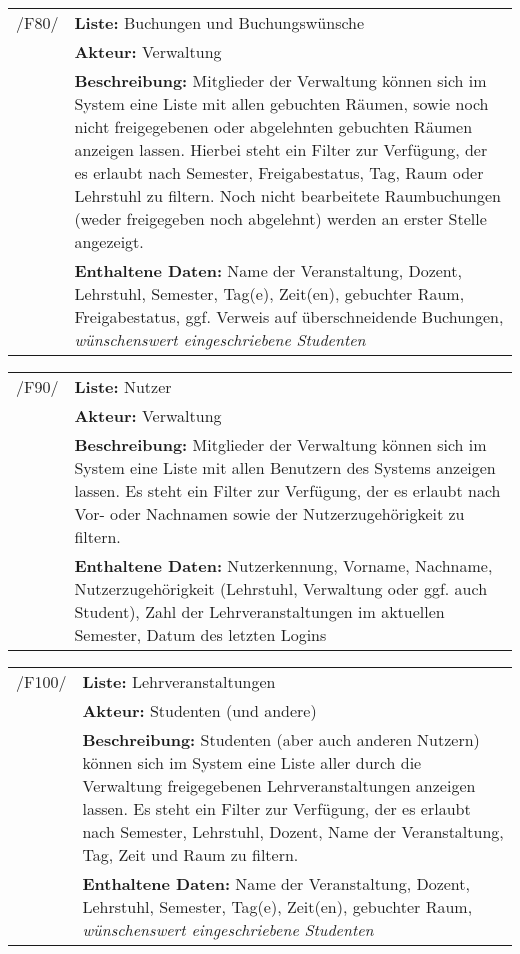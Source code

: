 \begin{tabular}{p{1.5cm}p{14.5cm}}
		
	 /F80/	& \textbf{Liste:} Buchungen und Buchungswünsche \\
				& \textbf{Akteur:} Verwaltung \\
				& \textbf{Beschreibung:} Mitglieder der Verwaltung können sich im System eine Liste mit allen gebuchten Räumen, sowie noch nicht freigegebenen oder abgelehnten gebuchten Räumen anzeigen lassen. Hierbei steht ein Filter zur Verfügung, der es erlaubt nach Semester, Freigabestatus, Tag, Raum oder Lehrstuhl zu filtern. Noch nicht bearbeitete Raumbuchungen (weder freigegeben noch abgelehnt) werden an erster Stelle angezeigt. \\
				& \textbf{Enthaltene Daten:} Name der Veranstaltung, Dozent, Lehrstuhl, Semester, Tag(e), Zeit(en), gebuchter Raum, Freigabestatus, ggf. Verweis auf überschneidende Buchungen, \textsl{wünschenswert eingeschriebene Studenten} \\[0.25cm]

\end{tabular}


\begin{tabular}{p{1.5cm}p{14.5cm}}
					
	 /F90/	& \textbf{Liste:} Nutzer \\
				& \textbf{Akteur:} Verwaltung \\
				& \textbf{Beschreibung:} Mitglieder der Verwaltung können sich im System eine Liste mit allen Benutzern des Systems anzeigen lassen. Es steht ein Filter zur Verfügung, der es erlaubt nach Vor- oder Nachnamen sowie der Nutzerzugehörigkeit zu filtern.\\
				& \textbf{Enthaltene Daten:} Nutzerkennung, Vorname, Nachname, Nutzerzugehörigkeit (Lehrstuhl, Verwaltung oder ggf. auch Student), Zahl der Lehrveranstaltungen im aktuellen Semester, Datum des letzten Logins \\[0.25cm]

\end{tabular}


\begin{tabular}{p{1.5cm}p{14.5cm}}
	
	 /F100/& \textbf{Liste:} Lehrveranstaltungen \\
				& \textbf{Akteur:} Studenten (und andere) \\
				& \textbf{Beschreibung:} Studenten (aber auch anderen Nutzern) können sich im System eine Liste aller durch die Verwaltung freigegebenen Lehrveranstaltungen anzeigen lassen. Es steht ein Filter zur Verfügung, der es erlaubt nach Semester, Lehrstuhl, Dozent, Name der Veranstaltung, Tag, Zeit und Raum zu filtern.\\
				& \textbf{Enthaltene Daten:} Name der Veranstaltung, Dozent, Lehrstuhl, Semester, Tag(e), Zeit(en), gebuchter Raum, \textsl{wünschenswert eingeschriebene Studenten} \\[0.25cm]

\end{tabular}


